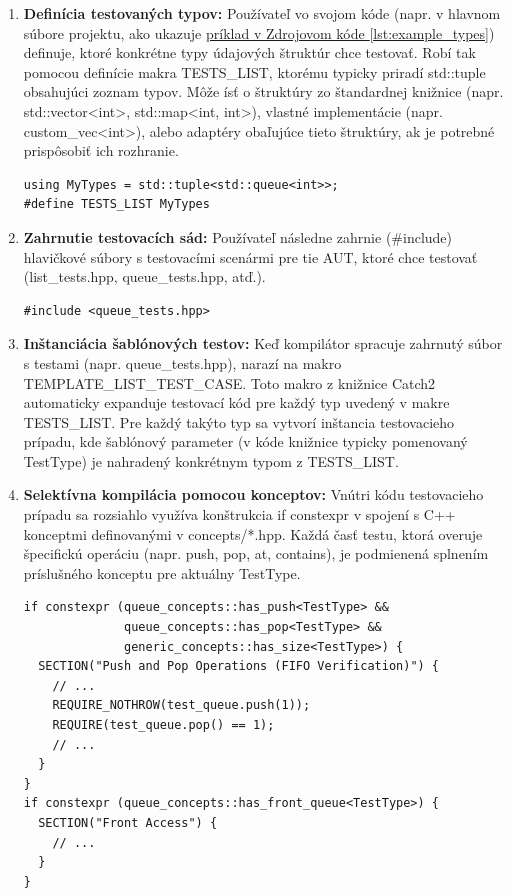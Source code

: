 \documentclass[11pt]{article}
\begin{document}
\begin{enumerate}
\item \textbf{Definícia testovaných typov:} Používateľ vo svojom kóde (napr. v hlavnom súbore projektu, ako ukazuje \hyperref[lst:example_types]{príklad v Zdrojovom kóde \ref*{lst:example_types}}) definuje, ktoré konkrétne typy údajových štruktúr chce testovať. Robí tak pomocou definície makra TESTS\_LIST, ktorému typicky priradí std::tuple obsahujúci zoznam typov. Môže ísť o štruktúry zo štandardnej knižnice (napr. std::vector<int>, std::map<int, int>), vlastné implementácie (napr. custom\_vec<int>), alebo adaptéry obaľujúce tieto štruktúry, ak je potrebné prispôsobiť ich rozhranie.
\begin{lstlisting}[label={lst:example_types}]
using MyTypes = std::tuple<std::queue<int>>;
#define TESTS_LIST MyTypes
\end{lstlisting}
\item \textbf{Zahrnutie testovacích sád:} Používateľ následne zahrnie (\#include) hlavičkové súbory s testovacími scenármi pre tie AUT, ktoré chce testovať (list\_tests.hpp, queue\_tests.hpp, atď.).
\begin{lstlisting}[label={lst:example_includes}]
#include <queue_tests.hpp>
\end{lstlisting}
\item \textbf{Inštanciácia šablónových testov:} Keď kompilátor spracuje zahrnutý súbor s testami (napr. queue\_tests.hpp), narazí na makro TEMPLATE\_LIST\_TEST\_CASE. Toto makro z knižnice Catch2 automaticky expanduje testovací kód pre každý typ uvedený v makre TESTS\_LIST. Pre každý takýto typ sa vytvorí inštancia testovacieho prípadu, kde šablónový parameter (v kóde knižnice typicky pomenovaný TestType) je nahradený konkrétnym typom z TESTS\_LIST.
\item \textbf{Selektívna kompilácia pomocou konceptov:} Vnútri kódu testovacieho prípadu sa rozsiahlo využíva konštrukcia if constexpr v spojení s C++ konceptmi definovanými v concepts/*.hpp. Každá časť testu, ktorá overuje špecifickú operáciu (napr. push, pop, at, contains), je podmienená splnením príslušného konceptu pre aktuálny TestType.
\begin{lstlisting}[caption={Použitie if constexpr a konceptov v teste (queue\_tests.hpp)}, label={lst:if_constexpr_example}]
if constexpr (queue_concepts::has_push<TestType> &&
              queue_concepts::has_pop<TestType> &&
              generic_concepts::has_size<TestType>) {
  SECTION("Push and Pop Operations (FIFO Verification)") {
    // ...
    REQUIRE_NOTHROW(test_queue.push(1));
    REQUIRE(test_queue.pop() == 1);
    // ...
  }
}
if constexpr (queue_concepts::has_front_queue<TestType>) {
  SECTION("Front Access") {
    // ...
  }
}
\end{lstlisting}


\end{enumerate}
\end{document}
